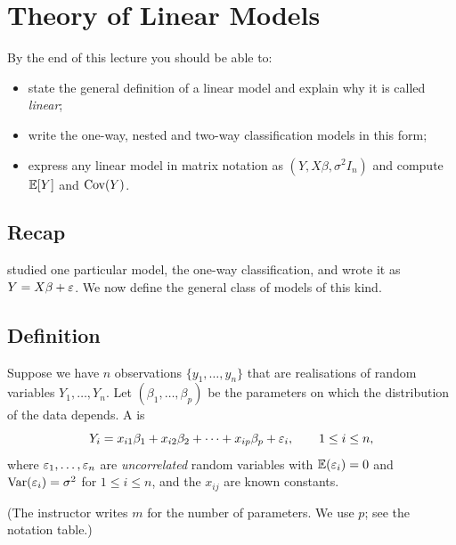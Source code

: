 \section{Theory of Linear Models}\label{sec:L09}


\begin{guiding*}
By the end of this lecture you should be able to:
\begin{itemize}
  \item state the general definition of a linear model and explain why it is called \emph{linear};
  \item write the one-way, nested and two-way classification models in this form;
  \item express any linear model in matrix notation as $(Y,X\beta,\sigma^2I_n)$ and compute $\mathbb E[Y]$ and $\operatorname{Cov}(Y)$.
\end{itemize}
\end{guiding*}

\subsection{Recap}
 studied one particular model, the one-way classification, and wrote it as
$Y=X\beta+\varepsilon$. We now define the general class of models of this kind.

\subsection{Definition}
\begin{definition}\label{def:L09-linmodel}
Suppose we have $n$ observations $\{y_1,\dots,y_n\}$ that are realisations of random variables
$Y_1,\dots,Y_n$. Let $(\beta_1,\dots,\beta_p)$ be the parameters on which the distribution of the
data depends. A  is
\[
Y_i=x_{i1}\beta_1+x_{i2}\beta_2+\dots+x_{ip}\beta_p+\varepsilon_i,\qquad 1\le i\le n,
\]
where $\varepsilon_1,\dots,\varepsilon_n$ are \emph{uncorrelated} random variables with $\mathbb E(\varepsilon_i)=0$ and
$\operatorname{Var}(\varepsilon_i)=\sigma^2$ for $1\le i\le n$, and the $x_{ij}$ are known constants.
\end{definition}
(The instructor writes $m$ for the number of parameters. We use $p$; see the notation table.)

